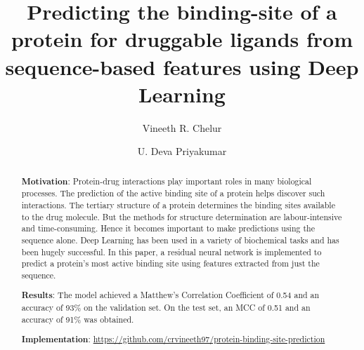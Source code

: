 \documentclass[journal=jacsat,manuscript=article]{achemso}
\author{Vineeth R. Chelur}
\author{U. Deva Priyakumar}
\affiliation[IIIT-H]
{Center for Computational Natural Sciences \& Bioinformatics, IIIT-H, Hyderabad}
\title[Predicting the binding-site of a protein for druggable ligands from sequence-based features using Deep Learning]
  {Predicting the binding-site of a protein for druggable ligands from sequence-based features using Deep Learning
  }
\begin{document}






\begin{abstract}
  \noindent\textbf{Motivation}: Protein-drug interactions play important roles in many biological processes. The prediction of the active binding site of a protein helps discover such interactions. The tertiary structure of a protein determines the binding sites available to the drug molecule. But the methods for structure determination are labour-intensive and time-consuming. Hence it becomes important to make predictions using the sequence alone. Deep Learning has been used in a variety of biochemical tasks and has been hugely successful. In this paper, a residual neural network is implemented to predict a protein's most active binding site using features extracted from just the sequence.

  \noindent\textbf{Results}: The model achieved a Matthew's Correlation Coefficient of 0.54 and an accuracy of 93\% on the validation set. On the test set, an MCC of 0.51 and an accuracy of 91\% was obtained.

  \noindent\textbf{Implementation}: \href{https://github.com/crvineeth97/protein-binding-site-prediction}{https://github.com/crvineeth97/protein-binding-site-prediction}
\end{abstract}
\end{document}
